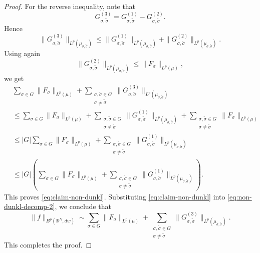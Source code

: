 \documentclass[12pt]{amsart}
\begin{document}
\begin{proof}
For the reverse inequality, note that
\[
G_{\sigma,\tilde{\sigma}}^{(3)}
=
G_{\sigma,\tilde{\sigma}}^{(1)}
-
G_{\sigma,\tilde{\sigma}}^{(2)}.
\]
Hence
\[
\|G_{\sigma,\tilde{\sigma}}^{(3)}\|_{L^p(\mu_{\sigma,\tilde{\sigma}})}
\le
\|G_{\sigma,\tilde{\sigma}}^{(1)}\|_{L^p(\mu_{\sigma,\tilde{\sigma}})}
+
\|G_{\sigma,\tilde{\sigma}}^{(2)}\|_{L^p(\mu_{\sigma,\tilde{\sigma}})}.
\]
Using again
\[
\|G_{\sigma,\tilde{\sigma}}^{(2)}\|_{L^p(\mu_{\sigma,\tilde{\sigma}})}
\le
\|F_\sigma\|_{L^p(\mu)},
\]
we get
\begin{align*}
&\sum_{\sigma\in G}\|F_\sigma\|_{L^p(\mu)}
+
\sum_{\substack{\sigma,\tilde{\sigma}\in G\\ \sigma\neq \tilde{\sigma}}}
\|G_{\sigma,\tilde{\sigma}}^{(3)}\|_{L^p(\mu_{\sigma,\tilde{\sigma}})}
\\
&\le
\sum_{\sigma\in G}\|F_\sigma\|_{L^p(\mu)}
+
\sum_{\substack{\sigma,\tilde{\sigma}\in G\\ \sigma\neq \tilde{\sigma}}}
\|G_{\sigma,\tilde{\sigma}}^{(1)}\|_{L^p(\mu_{\sigma,\tilde{\sigma}})}
+
\sum_{\substack{\sigma,\tilde{\sigma}\in G\\ \sigma\neq \tilde{\sigma}}}
\|F_\sigma\|_{L^p(\mu)}
\\
&\le
|G|
\sum_{\sigma\in G}\|F_\sigma\|_{L^p(\mu)}
+
\sum_{\substack{\sigma,\tilde{\sigma}\in G\\ \sigma\neq \tilde{\sigma}}}
\|G_{\sigma,\tilde{\sigma}}^{(1)}\|_{L^p(\mu_{\sigma,\tilde{\sigma}})}
\\
&\le
|G|
\left(
\sum_{\sigma\in G}\|F_\sigma\|_{L^p(\mu)}
+
\sum_{\substack{\sigma,\tilde{\sigma}\in G\\ \sigma\neq \tilde{\sigma}}}
\|G_{\sigma,\tilde{\sigma}}^{(1)}\|_{L^p(\mu_{\sigma,\tilde{\sigma}})}
\right).
\end{align*}
This proves \eqref{eq:claim-non-dunkl}. Substituting \eqref{eq:claim-non-dunkl} into \eqref{eq:non-dunkl-decomp-2}, we conclude that
\[
\|f\|_{B^p(\mathbb R^N,dw)}
\sim
\sum_{\sigma\in G}\|F_\sigma\|_{L^p(\mu)}
+
\sum_{\substack{\sigma,\tilde{\sigma}\in G\\ \sigma\neq \tilde{\sigma}}}
\|G_{\sigma,\tilde{\sigma}}^{(3)}\|_{L^p(\mu_{\sigma,\tilde{\sigma}})}.
\]
This completes the proof.
\end{proof}
\end{document}
